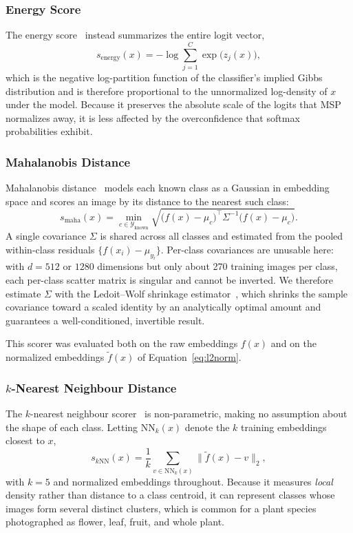 \documentclass[11pt]{article}
\begin{document}
\subsubsection{Energy Score}

The energy score~\cite{liu2020energy} instead summarizes the entire logit vector,
\begin{equation}
s_{\text{energy}}(x) = -\log \sum_{j=1}^{C} \exp\!\big(z_j(x)\big),
\end{equation}
which is the negative log-partition function of the classifier's implied Gibbs distribution and is therefore proportional to the unnormalized log-density of $x$ under the model. Because it preserves the absolute scale of the logits that MSP normalizes away, it is less affected by the overconfidence that softmax probabilities exhibit.

\subsubsection{Mahalanobis Distance}

Mahalanobis distance~\cite{lee2018simple} models each known class as a Gaussian in embedding space and scores an image by its distance to the nearest such class:
\begin{equation}
s_{\text{maha}}(x) = \min_{c \in \mathcal{Y}_{\text{known}}} \sqrt{\big(f(x) - \mu_c\big)^{\!\top} \Sigma^{-1} \big(f(x) - \mu_c\big)}.
\end{equation}
A single covariance $\Sigma$ is shared across all classes and estimated from the pooled within-class residuals $\{f(x_i) - \mu_{y_i}\}$. Per-class covariances are unusable here: with $d = 512$ or $1280$ dimensions but only about 270 training images per class, each per-class scatter matrix is singular and cannot be inverted. We therefore estimate $\Sigma$ with the Ledoit--Wolf shrinkage estimator~\cite{ledoit2004well}, which shrinks the sample covariance toward a scaled identity by an analytically optimal amount and guarantees a well-conditioned, invertible result.

This scorer was evaluated both on the raw embeddings $f(x)$ and on the normalized embeddings $\tilde{f}(x)$ of Equation~\eqref{eq:l2norm}.

\subsubsection{$k$-Nearest Neighbour Distance}

The $k$-nearest neighbour scorer~\cite{sun2022knnood} is non-parametric, making no assumption about the shape of each class. Letting $\mathrm{NN}_k(x)$ denote the $k$ training embeddings closest to $x$,
\begin{equation}
s_{k\text{NN}}(x) = \frac{1}{k} \sum_{v \in \mathrm{NN}_k(x)} \big\lVert \tilde{f}(x) - v \big\rVert_2,
\end{equation}
with $k = 5$ and normalized embeddings throughout. Because it measures \emph{local} density rather than distance to a class centroid, it can represent classes whose images form several distinct clusters, which is common for a plant species photographed as flower, leaf, fruit, and whole plant.
\end{document}
